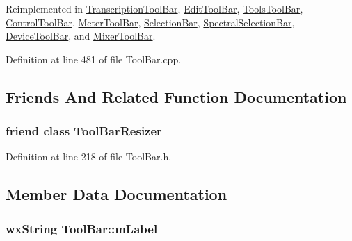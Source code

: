 Reimplemented in \hyperlink{class_transcription_tool_bar_a0050d3e1b08ad9b8a8af2750cb62c7b0}{Transcription\+Tool\+Bar}, \hyperlink{class_edit_tool_bar_a575e9c70b590d0f9b5c52fba3c4986ba}{Edit\+Tool\+Bar}, \hyperlink{class_tools_tool_bar_afd3429a743c0a10e6fb07b5c8f1c0fb8}{Tools\+Tool\+Bar}, \hyperlink{class_control_tool_bar_ab7c971607e2f3fdcc0a26af5896a0059}{Control\+Tool\+Bar}, \hyperlink{class_meter_tool_bar_a21cc887856b3bebc80e28490c74f6e9a}{Meter\+Tool\+Bar}, \hyperlink{class_selection_bar_ada9ebc9106b6056dc284bfa099203d0c}{Selection\+Bar}, \hyperlink{class_spectral_selection_bar_a0f842a28da1ea9adb3c9ad50197e11b8}{Spectral\+Selection\+Bar}, \hyperlink{class_device_tool_bar_a7eaec9a6fb8de87542542babff267a8b}{Device\+Tool\+Bar}, and \hyperlink{class_mixer_tool_bar_a9b821418b6018d0e6c660719e4160923}{Mixer\+Tool\+Bar}.



Definition at line 481 of file Tool\+Bar.\+cpp.



\subsection{Friends And Related Function Documentation}
\subsubsection[{\texorpdfstring{Tool\+Bar\+Resizer}{ToolBarResizer}}]{\setlength{\rightskip}{0pt plus 5cm}friend class {\bf Tool\+Bar\+Resizer}\hspace{0.3cm}{\ttfamily [friend]}}\hypertarget{class_tool_bar_a11c0b83e19a7463d933a5cc0ec840423}{}\label{class_tool_bar_a11c0b83e19a7463d933a5cc0ec840423}


Definition at line 218 of file Tool\+Bar.\+h.



\subsection{Member Data Documentation}
\subsubsection[{\texorpdfstring{m\+Label}{mLabel}}]{\setlength{\rightskip}{0pt plus 5cm}wx\+String Tool\+Bar\+::m\+Label\hspace{0.3cm}{\ttfamily [protected]}}\hypertarget{class_tool_bar_a90d11176b838d9da9241a6085f2871b5}{}\label{class_tool_bar_a90d11176b838d9da9241a6085f2871b5}



